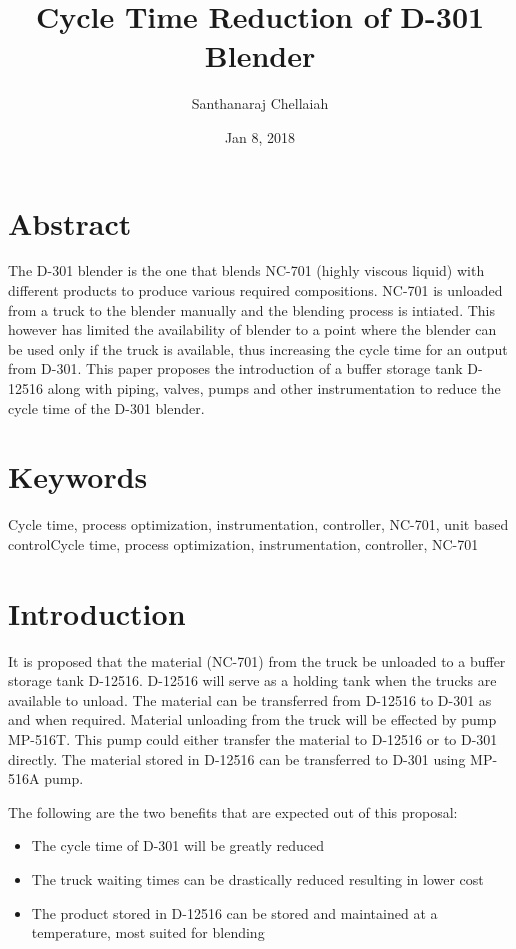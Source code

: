 \documentclass[a4paper,oneside]{article}
\author{Santhanaraj Chellaiah}
\date{Jan 8, 2018}
\title{Cycle Time Reduction of D-301 Blender}
\begin{document}
\maketitle
\section{Abstract}
\label{sec:org64722eb}
The D-301 blender is the one that blends NC-701 (highly viscous
liquid) with different products to produce various required
compositions. NC-701 is unloaded from a truck to the blender manually
and the blending process is intiated. This however has limited the
availability of blender to a point where the blender can be used only
if the truck is available, thus increasing the cycle time for an
output from D-301. This paper proposes the introduction of a buffer
storage tank D-12516 along with piping, valves, pumps and other
instrumentation to reduce the cycle time of the D-301 blender.

\section{Keywords}
\label{sec:org38c3ec1}
Cycle time, process optimization, instrumentation, controller, NC-701,
unit based controlCycle time, process optimization, instrumentation, controller, NC-701

\section{Introduction}
\label{sec:orgd170fe3}
It is proposed that the material (NC-701) from the truck be unloaded
to a buffer storage tank D-12516. D-12516 will serve as a holding tank
when the trucks are available to unload. The material can be
transferred from D-12516 to D-301 as and when required. Material
unloading from the truck will be effected by pump MP-516T. This pump
could either transfer the material to D-12516 or to D-301
directly. The material stored in D-12516 can be transferred to D-301
using MP-516A pump.  

The following are the two benefits that are expected out of this proposal: 
\begin{itemize}
\item The cycle time of D-301 will be greatly reduced
\item The truck waiting times can be drastically reduced resulting in lower cost
\item The product stored in D-12516 can be stored and maintained at a
temperature, most suited for blending
\end{itemize}
\end{document}
